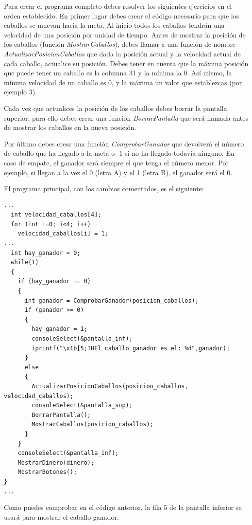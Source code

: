 Para crear el programa completo debes resolver los siguientes ejercicios en el orden establecido. En primer lugar debes crear el código necesario para que los caballos se muevan hacia la meta. Al inicio todos los caballos tendrán una velocidad de una posición por unidad de tiempo. Antes de mostrar la posición de los caballos (función \textit{MostrarCaballos}), debes llamar a una función de nombre \textit{ActualizarPosicionCaballos} que dada la posición actual y la velocidad actual de cada caballo, actualice su posición. Debes tener en cuenta que la máxima posición que puede tener un caballo es la columna 31 y la mínima la 0. Así mismo, la mínima velocidad de un caballo es 0, y la máxima un valor que establezcas (por ejemplo 3).

Cada vez que actualices la posición de los caballos debes borrar la pantalla superior, para ello debes crear una funcion \textit{BorrarPantalla} que será llamada antes de mostrar los caballos en la nueva posición.

Por último debes crear una función \textit{ComprobarGanador} que devolverá el número de caballo que ha llegado a la meta o -1 si no ha llegado todavía ninguno. En caso de empate, el ganador será siempre el que tenga el número menor. Por ejemplo, si llegan a la vez el 0 (letra A) y el 1 (letra B), el ganador será el 0.

\begin{example}
El programa principal, con los cambios comentados, es el siguiente:

\begin{lstlisting}
...
  int velocidad_caballos[4];
  for (int i=0; i<4; i++)
    velocidad_caballos[i] = 1;
...
  int hay_ganador = 0;
  while(1)
  {
    if (hay_ganador == 0)
    {
      int ganador = ComprobarGanador(posicion_caballos);
      if (ganador >= 0)
      {
        hay_ganador = 1;
        consoleSelect(&pantalla_inf);
        iprintf("\x1b[5;1HEl caballo ganador es el: %d",ganador);
      }
      else
      {
        ActualizarPosicionCaballos(posicion_caballos, velocidad_caballos);      
        consoleSelect(&pantalla_sup);
        BorrarPantalla();
        MostrarCaballos(posicion_caballos);
      }
    }
    consoleSelect(&pantalla_inf);
    MostrarDinero(dinero);
    MostrarBotones();
}
...
\end{lstlisting}
\end{example}

Como puedes comprobar en el código anterior, la fila 5 de la pantalla inferior se usará para mostrar el caballo ganador.

